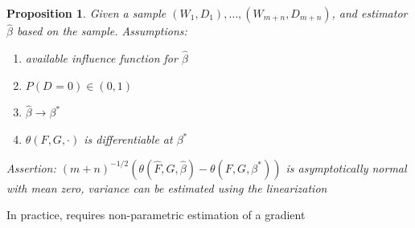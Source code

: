 \documentclass{beamer}
\renewcommand{\P}{P}
\newcommand{\W}[1][]{W_{#1}}
\newcommand{\D}[1][]{D_{#1}}
\renewcommand{\star}[1]{{#1}^\ast}
\newcommand{\F}{F}
\newcommand{\G}{G}
\newcommand{\N}{m+n}
\newcommand{\auc}{\theta}
\newtheorem{proposition}[theorem]{Proposition}
\newcommand{\speak}[1]{
  \iftoggle{speaktoggle}{
    {\tiny{\textcolor{red}{speak: #1}}\normalsize}
  }
  {}
}
\begin{document}
\begin{frame}
\begin{proposition} Given a sample
  $(\W[1],\D[1]),\ldots,(\W[\N],\D[\N])$, and estimator
  $\hat\beta$ based on the sample.
  Assumptions:
  \begin{enumerate}
  \item available influence function for
    $\hat\beta$
  \item $P(\D=0) \in (0,1)$
  \item $\hat\beta\to\star\beta$
  \item   $\auc(\F,\G,\cdot)$ is differentiable at $\star\beta$
  \end{enumerate}
  Assertion:
  $(\N)^{-1/2}(\auc(\hat\F,\hat\G,\hat\beta)-\auc(\F,\G,\star\beta))$
  is asymptotically normal with mean zero, variance can be estimated using the linearization%
\end{proposition}
In practice, requires non-parametric estimation of a gradient
\end{frame}


\end{document}
